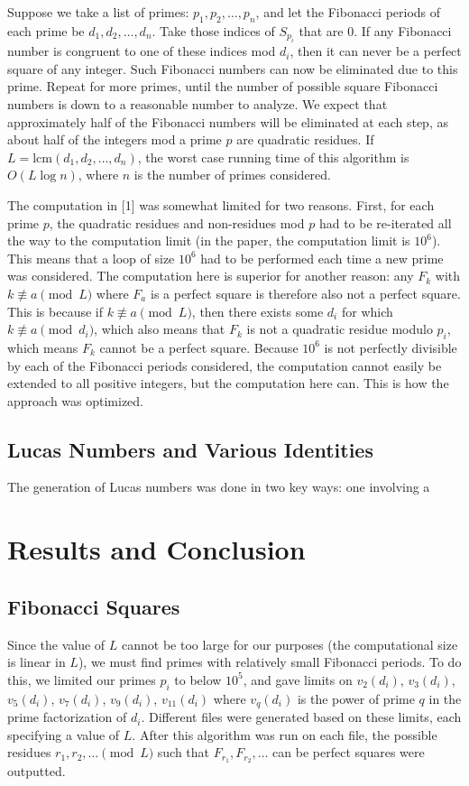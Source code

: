 \documentclass[11pt]{article}
\begin{document}
Suppose we take a list of primes: $p_1, p_2, \dots , p_n$, and let the Fibonacci periods of each prime be $d_1, d_2, \dots , d_n$. Take those indices of $S_{p_i}$ that are 0. If any Fibonacci number is congruent to one of these indices mod $d_i$, then it can never be a perfect square of any integer. Such Fibonacci numbers can now be eliminated due to this prime. Repeat for more primes, until the number of possible square Fibonacci numbers is down to a reasonable number to analyze. We expect that approximately half of the Fibonacci numbers will be eliminated at each step, as about half of the integers mod a prime $p$ are quadratic residues. If $L = \text{lcm}(d_1,d_2,\dots,d_n)$, the worst case running time of this algorithm is $O(L\log n)$, where $n$ is the number of primes considered.

The computation in [1] was somewhat limited for two reasons. First, for each prime $p$, the quadratic residues and non-residues mod $p$ had to be re-iterated all the way to the computation limit (in the paper, the computation limit is $10^6$). This means that a loop of size $10^6$ had to be performed each time a new prime was considered. The computation here is superior for another reason: any $F_k$ with $k \not\equiv a \pmod L$ where $F_a$ is a perfect square is therefore also not a perfect square. This is because if $k \not\equiv a \pmod L$, then there exists some $d_i$ for which $k \not\equiv a \pmod d_i$, which also means that $F_k$ is not a quadratic residue modulo $p_i$, which means $F_k$ cannot be a perfect square. Because $10^6$ is not perfectly divisible by each of the Fibonacci periods considered, the computation cannot easily be extended to all positive integers, but the computation here can. This is how the approach was optimized.

\subsection{Lucas Numbers and Various Identities}
The generation of Lucas numbers was done in two key ways: one involving a 


\section{Results and Conclusion}
\subsection{Fibonacci Squares}
Since the value of $L$ cannot be too large for our purposes (the computational size is linear in $L$), we must find primes with relatively small Fibonacci periods. To do this, we limited our primes $p_i$ to below $10^5$, and gave limits on $v_2(d_i)$, $v_3(d_i)$, $v_5(d_i)$, $v_7(d_i)$, $v_9(d_i)$, $v_{11}(d_i)$ where $v_q(d_i)$ is the power of prime $q$ in the prime factorization of $d_i$. Different files were generated based on these limits, each specifying a value of $L$. After this algorithm was run on each file, the possible residues $r_1, r_2, \dots \pmod L$ such that $F_{r_1}, F_{r_2}, \dots$ can be perfect squares were outputted.
\end{document}
